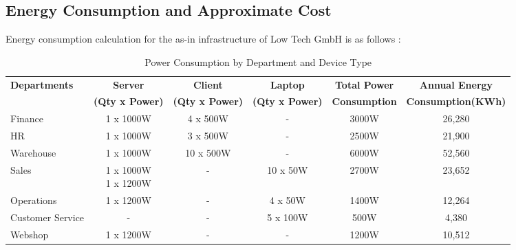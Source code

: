\documentclass{llncs}
\begin{document}
\subsection{Energy Consumption and Approximate Cost}

Energy consumption calculation for the as-in infrastructure of Low Tech GmbH is as follows : 

\begin{table}[htbp]
  \centering
  \begin{tabular}{|l|c|c|c|c|c|}
    \hline
    \textbf{Departments} & \textbf{Server}          & \textbf{Client}          & \textbf{Laptop}          & \textbf{Total Power}   & \textbf{Annual Energy}      \\
                         & \textbf{ (Qty x Power) } & \textbf{ (Qty x Power) } & \textbf{ (Qty x Power) } & \textbf{ Consumption } & \textbf{ Consumption(KWh) } \\
    \hline
    Finance              & 1 x 1000W                & 4 x 500W                 & -                        & 3000W                  & 26,280                      \\
    \hline
    HR                   & 1 x 1000W                & 3 x 500W                 & -                        & 2500W                  & 21,900                      \\
    \hline
    Warehouse            & 1 x 1000W                & 10 x 500W                & -                        & 6000W                  & 52,560                      \\
    \hline
    Sales                & \makecell{1 x 1000W                                                                                                                   \\ 1 x 1200W} & - & 10 x 50W & 2700W & 23,652 \\
    \hline
    Operations           & 1 x 1200W                & -                        & 4 x 50W                  & 1400W                  & 12,264                      \\
    \hline
    Customer Service     & -                        & -                        & 5 x 100W                 & 500W                   & 4,380                       \\
    \hline
    Webshop              & 1 x 1200W                & -                        & -                        & 1200W                  & 10,512                      \\
    \hline
  \end{tabular}
  \caption{Power Consumption by Department and Device Type}
  \label{tab:power_consumption}
\end{table}
\end{document}

